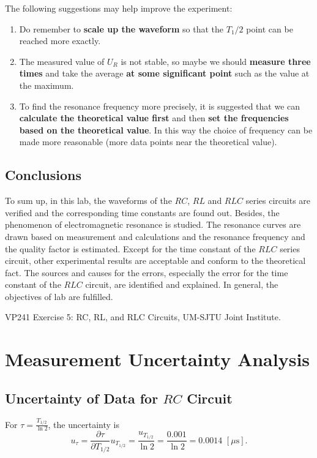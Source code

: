 \documentclass{article}
\begin{document}
The following suggestions may help improve the experiment:
\begin{enumerate}
    \item Do remember to \textbf{scale up the waveform} so that the $T_1/2$ point can be reached more exactly.
    \item The measured value of $U_R$ is not stable, so maybe we should \textbf{measure three times} and take the average \textbf{at some significant point} such as the value at the maximum.
    \item To find the resonance frequency more precisely, it is suggested that we can \textbf{calculate the theoretical value first} and then \textbf{set the frequencies based on the theoretical value}. In this way the choice of frequency can be made more reasonable (more data points near the theoretical value).
\end{enumerate}

\subsection{Conclusions}

To sum up, in this lab, the waveforms of the $RC$, $RL$ and $RLC$ series circuits are verified and the corresponding time constants are found out. Besides, the phenomenon of electromagnetic resonance is studied. The resonance curves are drawn based on measurement and calculations and the resonance frequency and the quality factor is estimated. Except for the time constant of the $RLC$ series circuit, other experimental results are acceptable and conform to the theoretical fact. The sources and causes for the errors, especially the error for the time constant of the $RLC$ circuit, are identified and explained. In general, the objectives of lab are fulfilled.

\begin{thebibliography}{1}

     VP241 Exercise 5: RC, RL, and RLC Circuits, UM-SJTU Joint Institute.

\end{thebibliography}

\newpage

\appendix

\section{Measurement Uncertainty Analysis}

\subsection{Uncertainty of Data for $RC$ Circuit}
For $\tau = \frac{T_{1/2}}{\ln 2}$, the uncertainty is
$$u_\tau = \frac{\partial \tau}{\partial T_{1/2}}u_{T_{1/2}} = \frac{u_{T_{1/2}}}{\ln 2} = \frac{0.001}{\ln 2} = 0.0014\,\,[\mu\text{s}].$$
\end{document}
